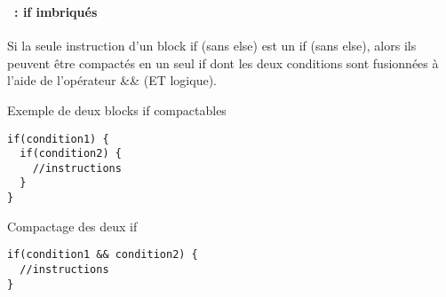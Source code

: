 \begin{frame}[containsverbatim]
  \frametitle{\secname}
  \framesubtitle{\subsecname~: if imbriqués}

  Si la seule instruction d'un block if (sans else) est un if (sans else), alors ils peuvent être compactés en un seul if dont les deux conditions sont fusionnées à l'aide de l'opérateur \&\& (ET logique).
  \begin{exampleblock}{Exemple de deux blocks if compactables}
    \begin{verbatim}
if(condition1) {
  if(condition2) {
    //instructions
  }
}\end{verbatim}
  \end{exampleblock}
  \begin{exampleblock}{Compactage des deux if}
    \begin{verbatim}
if(condition1 && condition2) {
  //instructions
}\end{verbatim}
  \end{exampleblock}
\end{frame}


